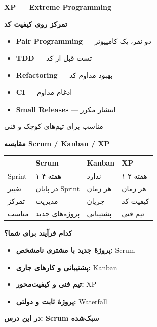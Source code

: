 \documentclass[14pt, a4paper, landscape]{extarticle}
\newcommand{\slide}[1]{%
    \newpage
    \begin{center}
    \begin{minipage}[t]{0.95\textwidth}
    \vspace{0.5cm}
    #1
    \vspace{0.5cm}
    \end{minipage}
    \end{center}
}
\newcommand{\slidetitle}[1]{%
    \begin{center}
        {\LARGE\bfseries\textcolor{primary}{#1}}
    \end{center}
    \vspace{0.5cm}
}
\newcommand{\myaccent}[1]{\textcolor{accent}{#1}}
\begin{document}
\slide{
    \slidetitle{XP — Extreme Programming}
    \vspace{0.5cm}
    \begin{center}
        {\large\bfseries تمرکز روی کیفیت کد}
    \end{center}
    \vspace{0.8cm}
    \begin{itemize}[itemsep=0.5em]
        \item {\large\textbf{Pair Programming} — دو نفر، یک کامپیوتر}
        \item {\large\textbf{TDD} — تست قبل از کد}
        \item {\large\textbf{Refactoring} — بهبود مداوم کد}
        \item {\large\textbf{CI} — ادغام مداوم}
        \item {\large\textbf{Small Releases} — انتشار مکرر}
    \end{itemize}
    \vspace{0.5cm}
    \begin{center}
        {\myaccent{مناسب برای تیم‌های کوچک و فنی}}
    \end{center}
}

\slide{
    \slidetitle{مقایسه Scrum / Kanban / XP}
    \vspace{0.3cm}
    \begin{center}
        \begin{tabular}{lp{3.5cm}p{3.5cm}p{3.5cm}}
            \toprule
            & \textbf{Scrum} & \textbf{Kanban} & \textbf{XP} \\
            \midrule
            Sprint & ۱-۴ هفته & ندارد & ۱-۲ هفته \\
            \hline
            تغییر & در پایان Sprint & هر زمان & هر زمان \\
            \hline
            تمرکز & مدیریت & جریان & کیفیت کد \\
            \hline
            مناسب & پروژه‌های جدید & پشتیبانی & تیم فنی \\
            \bottomrule
        \end{tabular}
    \end{center}
}

\slide{
    \slidetitle{کدام فرآیند برای شما؟}
    \vspace{0.5cm}
    \begin{itemize}[itemsep=0.7em]
        \item {\large\textbf{پروژهٔ جدید با مشتری نامشخص:} Scrum}
        \item {\large\textbf{پشتیبانی و کارهای جاری:} Kanban}
        \item {\large\textbf{تیم فنی و کیفیت‌محور:} XP}
        \item {\large\textbf{پروژهٔ ثابت و دولتی:} Waterfall}
    \end{itemize}
    \vspace{1cm}
    \begin{center}
        {\large\bfseries\myaccent{در این درس: Scrum سبک‌شده}}
    \end{center}
}
\end{document}
